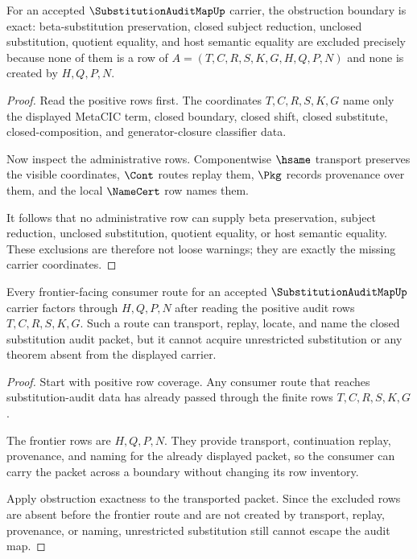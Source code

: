 \begin{theorem}
\label{thm:substitutionauditmap-obstruction-row-exactness}
For an accepted $\SubstitutionAuditMapUp$ carrier, the obstruction boundary is exact: beta-substitution preservation, closed subject reduction, unclosed substitution, quotient equality, and host semantic equality are excluded precisely because none of them is a row of $A=(T,C,R,S,K,G,H,Q,P,N)$ and none is created by $H,Q,P,N$.
\end{theorem}
\begin{proof}
Read the positive rows first. The coordinates $T,C,R,S,K,G$ name only the displayed MetaCIC term, closed boundary, closed shift, closed substitute, closed-composition, and generator-closure classifier data.

Now inspect the administrative rows. Componentwise $\hsame$ transport preserves the visible coordinates, $\Cont$ routes replay them, $\Pkg$ records provenance over them, and the local $\NameCert$ row names them.

It follows that no administrative row can supply beta preservation, subject reduction, unclosed substitution, quotient equality, or host semantic equality. These exclusions are therefore not loose warnings; they are exactly the missing carrier coordinates.
\end{proof}

\begin{theorem}
\label{thm:substitutionauditmap-frontier-route-nonescape}
Every frontier-facing consumer route for an accepted $\SubstitutionAuditMapUp$ carrier factors through $H,Q,P,N$ after reading the positive audit rows $T,C,R,S,K,G$. Such a route can transport, replay, locate, and name the closed substitution audit packet, but it cannot acquire unrestricted substitution or any theorem absent from the displayed carrier.
\end{theorem}
\begin{proof}
Start with positive row coverage. Any consumer route that reaches substitution-audit data has already passed through the finite rows $T,C,R,S,K,G$.

The frontier rows are $H,Q,P,N$. They provide transport, continuation replay, provenance, and naming for the already displayed packet, so the consumer can carry the packet across a boundary without changing its row inventory.

Apply obstruction exactness to the transported packet. Since the excluded rows are absent before the frontier route and are not created by transport, replay, provenance, or naming, unrestricted substitution still cannot escape the audit map.
\end{proof}


